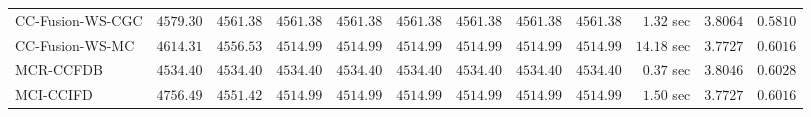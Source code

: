 \begin{table}[H]
\begin{tabular}{lrrrrrrrrrrr}
    CC-Fusion-WS-CGC & $      4579.30$ & $      4561.38$ & $      4561.38$ & $      4561.38$ & $      4561.38$ & $      4561.38$ & $      4561.38$ & $      4561.38$ & $         1.32$ sec    & $       3.8064$  & $       0.5810$ \\ 
     CC-Fusion-WS-MC & $      4614.31$ & $      4556.53$ & $      4514.99$ & $      4514.99$ & $      4514.99$ & $      4514.99$ & $      4514.99$ & $      4514.99$ & $        14.18$ sec    & $       3.7727$  & $       0.6016$ \\ 
\cmidrule{1-1} 
           MCR-CCFDB & $      4534.40$ & $      4534.40$ & $      4534.40$ & $      4534.40$ & $      4534.40$ & $      4534.40$ & $      4534.40$ & $      4534.40$ & $         0.37$ sec    & $       3.8046$  & $       0.6028$ \\ 
\cmidrule{1-1} 
           MCI-CCIFD & $      4756.49$ & $      4551.42$ & $      4514.99$ & $      4514.99$ & $      4514.99$ & $      4514.99$ & $      4514.99$ & $      4514.99$ & $         1.50$ sec    & $       3.7727$  & $       0.6016$ \\ 
\bottomrule
\end{tabular}
\end{table}

